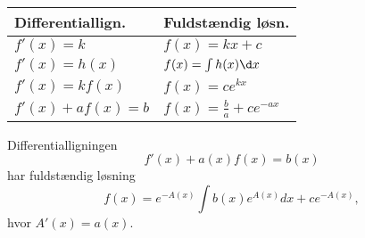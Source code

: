 

\begin{center}
\begin{tabular}{@{}l l@{}}
Differentiallign.    & Fuldstændig løsn.				\\ \toprule
$f'(x)=k$				& $f(x)=kx+c$						\\ \midrule
$f'(x)=h(x)$			& $f(x)=\int h(x) \d x$				\\ \midrule
$f'(x)=kf(x)$			& $f(x)=ce^{kx}$					\\ \midrule
$f'(x)+ af(x) =b$		& $f(x)=\frac{b}{a}+ce^{-ax}$		\\ \bottomrule  
\end{tabular}
\end{center}

Differentialligningen 
\begin{equation*}
f'(x)+a(x)f(x)=b(x)
\end{equation*}
har fuldstændig løsning
\begin{equation*}
f(x)=e^{-A(x)}\int b(x) e^{A(x)}dx +ce^{-A(x)},
\end{equation*}
hvor $A'(x)=a(x)$.